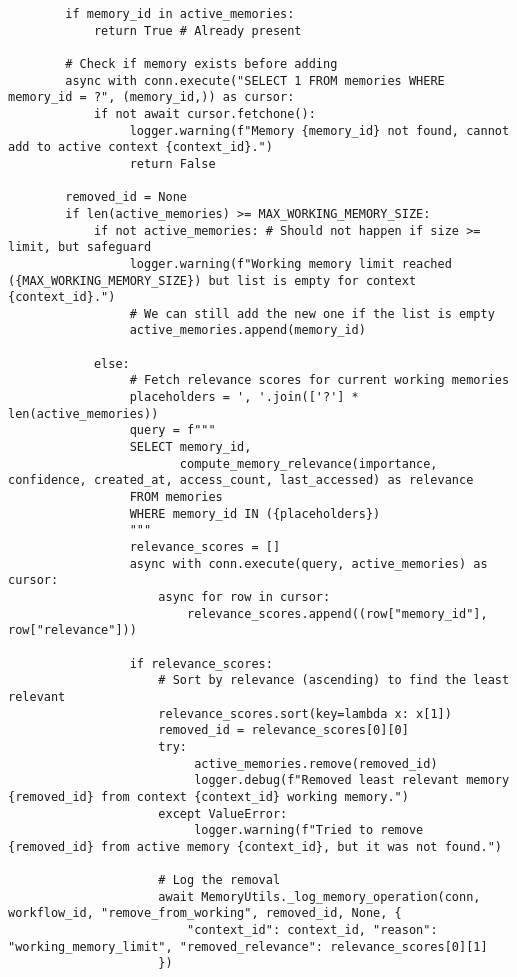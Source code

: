 \documentclass[12pt,a4paper]{article}
\begin{document}
\begin{pageablecode}
\begin{verbatim}
        if memory_id in active_memories:
            return True # Already present

        # Check if memory exists before adding
        async with conn.execute("SELECT 1 FROM memories WHERE memory_id = ?", (memory_id,)) as cursor:
            if not await cursor.fetchone():
                 logger.warning(f"Memory {memory_id} not found, cannot add to active context {context_id}.")
                 return False

        removed_id = None
        if len(active_memories) >= MAX_WORKING_MEMORY_SIZE:
            if not active_memories: # Should not happen if size >= limit, but safeguard
                 logger.warning(f"Working memory limit reached ({MAX_WORKING_MEMORY_SIZE}) but list is empty for context {context_id}.")
                 # We can still add the new one if the list is empty
                 active_memories.append(memory_id)

            else:
                 # Fetch relevance scores for current working memories
                 placeholders = ', '.join(['?'] * len(active_memories))
                 query = f"""
                 SELECT memory_id,
                        compute_memory_relevance(importance, confidence, created_at, access_count, last_accessed) as relevance
                 FROM memories
                 WHERE memory_id IN ({placeholders})
                 """
                 relevance_scores = []
                 async with conn.execute(query, active_memories) as cursor:
                     async for row in cursor:
                         relevance_scores.append((row["memory_id"], row["relevance"]))

                 if relevance_scores:
                     # Sort by relevance (ascending) to find the least relevant
                     relevance_scores.sort(key=lambda x: x[1])
                     removed_id = relevance_scores[0][0]
                     try:
                          active_memories.remove(removed_id)
                          logger.debug(f"Removed least relevant memory {removed_id} from context {context_id} working memory.")
                     except ValueError:
                          logger.warning(f"Tried to remove {removed_id} from active memory {context_id}, but it was not found.")

                     # Log the removal
                     await MemoryUtils._log_memory_operation(conn, workflow_id, "remove_from_working", removed_id, None, {
                         "context_id": context_id, "reason": "working_memory_limit", "removed_relevance": relevance_scores[0][1]
                     })


\end{verbatim}
\end{pageablecode}
\end{document}
